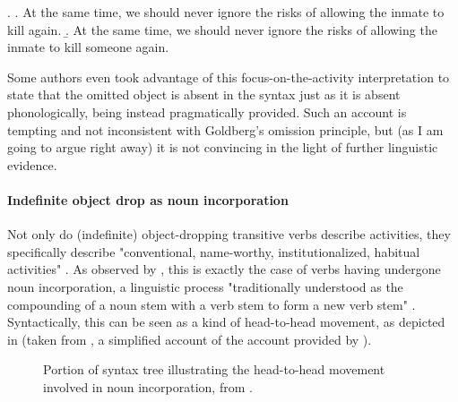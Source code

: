 \ex. \label{greene} \a. \label{greene1} At the same time, we should never ignore the risks of allowing the inmate to kill again.
\b. \label{greene2} At the same time, we should never ignore the risks of allowing the inmate to kill someone again.

Some authors \parencite{groefsema1995understood, recanati2002unarticulated, WilsonSperber2000, iten2005null, hall2009free} even took advantage of this focus-on-the-activity interpretation to state that the omitted object is absent in the syntax just as it is absent phonologically, being instead pragmatically provided.  Such an account is tempting and not inconsistent with Goldberg's omission principle, but (as I am going to argue right away) it is not convincing in the light of further linguistic evidence. 


\paragraph{Indefinite object drop as noun incorporation}

Not only do (indefinite) object-dropping transitive verbs describe activities, they specifically describe "conventional, name-worthy, institutionalized, habitual activities" \parencite[119]{Dvorak2017thesis}. As observed by \textcite{Marti2010, Marti2015, Yasutake1987, BourmayanRecanati2013}, this is exactly the case of verbs having undergone noun incorporation, a linguistic process "traditionally understood as the compounding of a noun stem with a verb stem to form a new verb stem" \parencite[5]{mithun2009polysynthesis}. Syntactically, this can be seen as a kind of head-to-head movement, as depicted in  (taken from \textcite[495]{carnie2021syntax}, a simplified account of the account provided by \textcite{baker1988theta}).

\begin{figure}[htb]
\caption{Portion of syntax tree illustrating the head-to-head movement involved in noun incorporation, from \textcite[495]{carnie2021syntax}.}
\end{figure}

